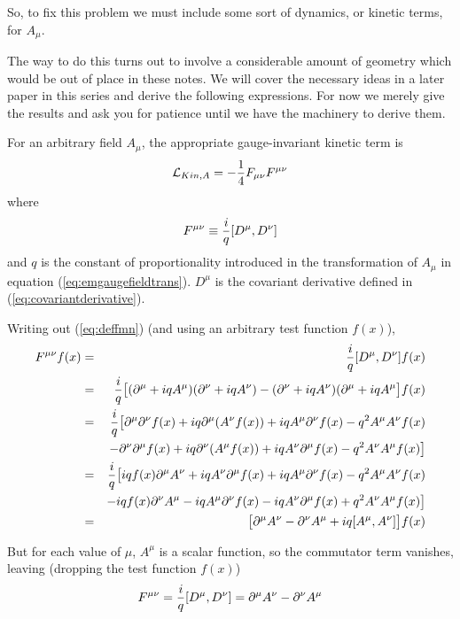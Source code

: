 \documentclass[12pt,epsf]{article}
\def\nolabel{\nonumber }
\def\nolabel{\nonumber }
\begin{document}
So, to fix this problem we must include some sort of dynamics, or
kinetic terms, for $A_{\mu}$.  

The way to do this turns out to involve a considerable amount of
geometry which would be out of place in these notes.  We will cover the
necessary ideas in a later paper in this series and derive the
following expressions.	For now we merely give the results and ask you
for patience until we have the machinery to derive them.  

For an arbitrary field $A_{\mu}$, the appropriate gauge-invariant
kinetic term is 
\begin{eqnarray}
\mathcal{L}_{Kin,A} = -{1\over 4} F_{\mu \nu}F^{\mu \nu}\nolabel
\end{eqnarray} 
where 
\begin{eqnarray}
F^{\mu \nu} \equiv {i \over q}[D^{\mu},D^{\nu}] \label{eq:deffmn}
\end{eqnarray}
and $q$ is the constant of proportionality introduced in the
transformation of $A_{\mu}$ in equation (\ref{eq:emgaugefieldtrans}).
$D^{\mu}$ is the covariant derivative defined in
(\ref{eq:covariantderivative}).  

Writing out (\ref{eq:deffmn}) (and using an arbitrary test function
$f(x)$),
\begin{eqnarray}
F^{\mu \nu}f(x) &=& {i\over q} [D^{\mu},D^{\nu}]f(x) \nolabel \\
&=& {i\over q} \big[(\partial^{\mu} +
iqA^{\mu})(\partial^{\nu}+iqA^{\nu}) -
(\partial^{\nu}+iqA^{\nu})(\partial^{\mu}+iqA^{\mu}\big]f(x) \nolabel
\\
&=& {i \over q}\big[\partial^{\mu}\partial^{\nu}f(x) +
iq\partial^{\mu}(A^{\nu}f(x))+iqA^{\mu}\partial^{\nu}f(x) -
q^2A^{\mu}A^{\nu}f(x)  \nolabel \\
& & -\partial^{\nu}\partial^{\mu}f(x) +
iq\partial^{\nu}(A^{\mu}f(x))+iqA^{\nu}\partial^{\mu}f(x) -
q^2A^{\nu}A^{\mu}f(x)\big]  \nolabel \\
&=& {i\over q}\big[iqf(x)\partial^{\mu}A^{\nu} +
iqA^{\nu}\partial^{\mu}f(x) + iqA^{\mu}\partial^{\nu}f(x) -
q^2A^{\mu}A^{\nu}f(x) \nolabel \\
& & -iqf(x)\partial^{\nu}A^{\mu} - iqA^{\mu}\partial^{\nu}f(x) -
iqA^{\nu}\partial^{\mu}f(x) + q^2A^{\nu}A^{\mu}f(x)\big] \nolabel \\
&=& \big[\partial^{\mu}A^{\nu} - \partial^{\nu}A^{\mu} +
iq[A^{\mu},A^{\nu}]\big] f(x)\nolabel
\end{eqnarray}

But for each value of $\mu$, $A^{\mu}$ is a scalar function, so the
commutator term vanishes, leaving (dropping the test function $f(x)$)
\begin{eqnarray}
F^{\mu \nu} = {i\over q}[D^{\mu},D^{\nu}] = \partial^{\mu} A^{\nu} -
\partial^{\nu}A^{\mu} \label{eq:qwerqwer}
\end{eqnarray}
\end{document}
